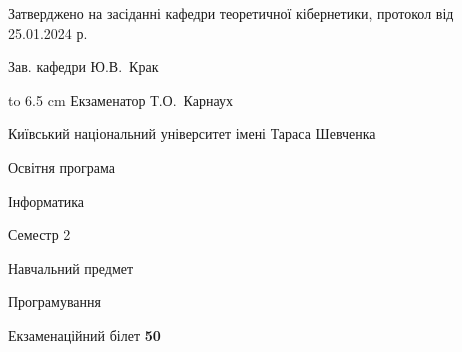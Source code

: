 \documentclass[12pt, ukrainian]{article}
\begin{document}
{\smallskip\smallskip \begin {scriptsize} Затверджено на засіданні кафедри теоретичної кібернетики, протокол   від   25.01.2024 р.\par\smallskip\smallskip\smallskip\smallskip
{\parbox {6.5 cm} {Зав. кафедри \dotfill Ю.В.~Крак}}\hspace {0.7cm} {\hbox to 6.5 cm { Екзаменатор \dotfill Т.О.~Карнаух}} \end{scriptsize}}
\newpage
{{\begin {scriptsize}\par
{ \center  Київський національний університет імені Тараса Шевченка \par}
{\parbox {5 cm}{Освітня програма \hfill}{\parbox {7 cm}{Інформатика\hfill}}\parbox {6 cm}{\hfill Семестр 2}}\par
{\parbox {5 cm} {Навчальний предмет \hfill}\parbox {7 cm}{Програмування \hfill}\parbox {6cm}{\hfill}\par}\vspace{-15pt} \end{scriptsize}}{\center Екзаменаційний білет \No \textbf { 50 }\par}}
\end{document}
